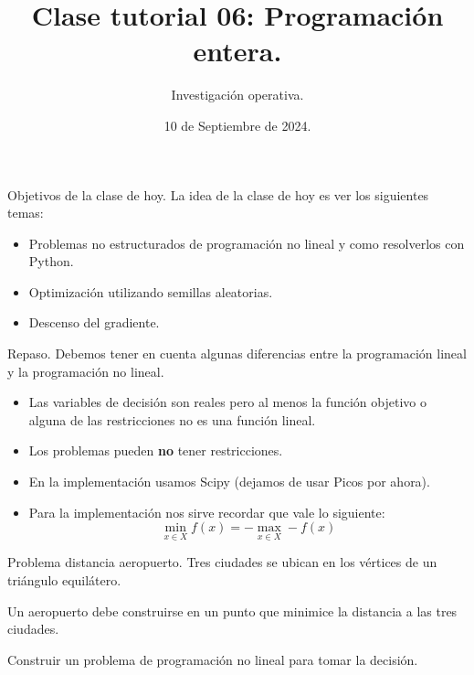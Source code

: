 \documentclass{beamer}
\title[]{Clase tutorial 06: Programación entera.}
\date{10 de Septiembre de 2024.}
\author[]{ Investigación operativa.
  }
\institute{Universidad de San Andrés}
\begin{document}
\maketitle

\begin{frame}{Objetivos de la clase de hoy.}
  La idea de la clase de hoy es ver los siguientes temas:
  \begin{itemize}
    \item Problemas no estructurados de programación no lineal y como resolverlos con Python.
    \item Optimización utilizando semillas aleatorias.
    \item Descenso del gradiente.
  \end{itemize}
\end{frame}

\begin{frame}[fragile]{Repaso.}
  Debemos tener en cuenta algunas diferencias entre la programación lineal y la programación no lineal.
  \pause 
  \begin{itemize}
    \item Las variables de decisión son reales pero al menos la función objetivo o alguna de las restricciones no es una función lineal.
    \pause 
    \item Los problemas pueden \textbf{no} tener restricciones.
    \pause 
    \item En la implementación usamos Scipy (dejamos de usar Picos por ahora).
    \pause 
    \item Para la implementación nos sirve recordar que vale lo siguiente:
      \[
        \min_{x \in X} f(x) = - \max_{x \in X} -f(x)
      \]
  \end{itemize}
\end{frame}

\begin{frame}[fragile]{Problema distancia aeropuerto.}
  Tres ciudades se ubican en los vértices de un triángulo equilátero.

  Un aeropuerto debe construirse en un punto que minimice la distancia a las tres ciudades.

  Construir un problema de programación no lineal para tomar la decisión.
\end{frame}
\end{document}

